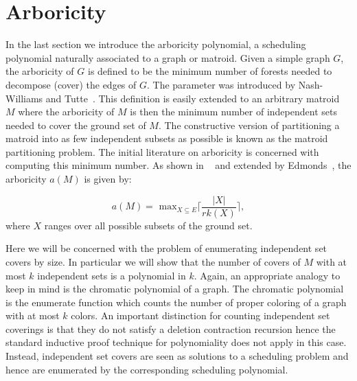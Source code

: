 \documentclass[12pt,reqno]{amsart}
\numberwithin{definition}{section}
\theoremstyle{definition}
\begin{document}
\section{Arboricity}
\label{arboricty}


In the last section we introduce the arboricity polynomial, a
scheduling polynomial naturally associated to a graph or matroid.
Given a simple graph $G$, the arboricity of $G$ is defined to be the
minimum number of forests needed to decompose (cover) the edges of
$G$.  The parameter was introduced by Nash-Williams and Tutte~\cite{Nash, Tutte}.
This definition is easily extended to an arbitrary matroid $M$ where the
arboricity of $M$ is then the minimum number of independent sets needed to
cover the ground set of $M$.  The constructive version of partitioning
a matroid into as few independent subsets as possible is known as the
matroid partitioning problem. The initial
literature on arboricity is concerned with computing this minimum number.  As shown in 
~\cite{Nash, Tutte} and extended by Edmonds~\cite{Edmonds}, the arboricity $a(M)$ is given
by:

$$ a(M) = \textrm{ max}_{X\subseteq E} \lceil { \frac{|X|}{rk(X)}} \rceil, $$
where $X$ ranges over all possible subsets of the ground set.

Here we will be concerned with the problem of enumerating independent
set covers by size.  In particular we will show that the number of
covers of $M$ with at most $k$ independent sets is a polynomial in
$k$.  Again, an appropriate analogy to keep in mind is the chromatic
polynomial of a graph.  The chromatic polynomial is the enumerate
function which counts the number of proper coloring of a graph with at
most $k$ colors.  
 An important distinction for counting independent set coverings is
 that they do not satisfy a deletion contraction recursion hence the
 standard inductive proof technique for polynomiality does not apply in
 this case.  Instead, independent set covers are seen as solutions to
 a scheduling problem and hence are enumerated by the corresponding
 scheduling polynomial.
\end{document}
